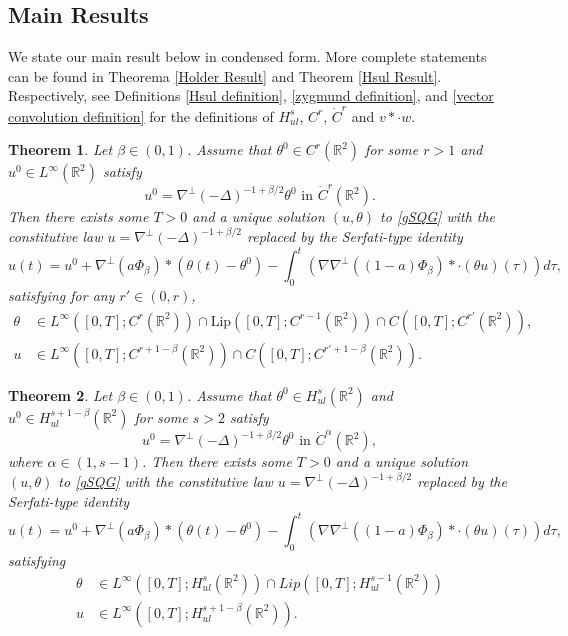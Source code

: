 \documentclass[12pt,xcolor=svgnames]{amsart}
\newtheorem{theorem}{Theorem}[section]
\newcommand{\R}{\mathbb{R}}
\begin{document}
\subsection{Main Results}
We state our main result below in condensed form. More complete statements can be found in Theorema \ref{Holder Result} and Theorem \ref{Hsul Result}. Respectively, see Definitions \ref{Hsul definition}, \ref{zygmund definition}, and \ref{vector convolution definition} for the definitions of $H^s_{ul}$, $C^r$, $\dot{C}^r$ and $v\ast\cdot w$.
 \begin{theorem}
Let $\beta \in (0,1)$. Assume that $\theta^0 \in C^r(\R^2)$ for some $r>1$ and $u^0 \in L^{\infty}(\R^2)$ satisfy $$u^0 = \nabla^{\perp}(-\Delta)^{-1+\beta/2}\theta^0 \text{ in } \dot{C}^r(\R^2).$$ Then there exists some $T>0$ and a unique solution $(u,\theta)$ to \eqref{gSQG} with the constitutive law $u=\nabla^{\perp}(-\Delta)^{-1+\beta/2}$ replaced by the Serfati-type identity
$$
u(t)=u^0 + \nabla^{\perp}(a\Phi_{\beta}) \ast (\theta(t)-\theta^0) -\int_0^t (\nabla\nabla^{\perp}((1-a)\Phi_{\beta})\ast\cdot(\theta u)(\tau))d\tau,
$$
satisfying for any $r'\in (0,r)$,
\begin{align*}
\theta &\in L^{\infty}([0,T]; C^r(\R^2)) \cap \text{Lip}([0,T]; C^{r-1}(\R^2)) \cap C([0,T]; C^{r'}(\R^2)),\\
u &\in L^{\infty}([0,T]; C^{r+1-\beta}(\R^2)) \cap C([0,T]; C^{r'+1-\beta}(\R^2)).
\end{align*}
\end{theorem}
\begin{theorem}
Let $\beta \in (0,1)$. Assume that $\theta^0 \in H_{ul}^s(\R^2)$ and $u^0 \in H_{ul}^{s+1-\beta}(\R^2)$ for some $s>2$ satisfy 
 $$u^0 = \nabla^{\perp}(-\Delta)^{-1+\beta/2}\theta^0 \text{ in } \dot{C}^{\alpha}(\R^2),$$ where $\alpha \in (1,s-1)$.
 Then there exists some $T>0$ and a unique solution $(u,\theta)$ to \eqref{gSQG} with the constitutive law $u=\nabla^{\perp}(-\Delta)^{-1+\beta/2}$ replaced by the Serfati-type identity
$$
u(t)=u^0 + \nabla^{\perp}(a\Phi_{\beta}) \ast (\theta(t)-\theta^0) -\int_0^t (\nabla\nabla^{\perp}((1-a)\Phi_{\beta})\ast\cdot(\theta u)(\tau))d\tau,
$$
satisfying
 \begin{align*}
\theta &\in L^{\infty}([0,T];H_{ul}^s(\R^2)) \cap Lip([0,T];H_{ul}^{s-1}(\R^2)) \\
u &\in L^{\infty}([0,T]; H_{ul}^{s+1-\beta}(\R^2)). 
\end{align*}
 \end{theorem}
\end{document}
